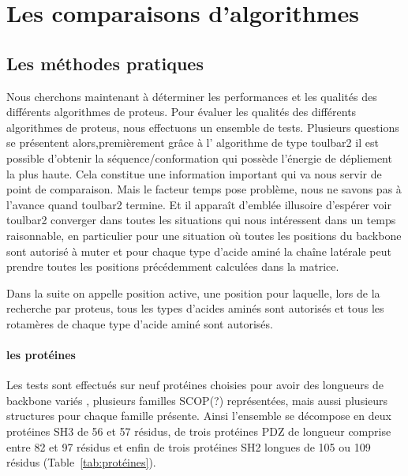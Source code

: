 \chapter{Les comparaisons d'algorithmes}
\label{chap:resultats_comparaisons}


\section{Les méthodes pratiques} 

Nous cherchons maintenant à déterminer les performances et les qualités des différents algorithmes de proteus.
Pour évaluer les qualités des différents algorithmes de proteus, nous effectuons un ensemble de tests. 
Plusieurs questions se présentent alors,premièrement grâce à l' algorithme de type toulbar2 il est possible d'obtenir la séquence/conformation qui possède l'énergie de dépliement la plus haute. Cela constitue une information important qui va nous servir de point de comparaison. Mais le facteur temps pose problème, nous ne savons pas à l'avance quand toulbar2 termine. Et il apparaît d'emblée illusoire d'espérer voir toulbar2 converger dans toutes les situations qui nous intéressent dans un temps raisonnable, en particulier pour une situation où  toutes les positions du  backbone sont autorisé à muter et pour chaque type d'acide aminé la chaîne latérale peut prendre toutes les positions précédemment calculées dans la matrice. 


Dans la suite on appelle position active, une position pour laquelle, lors de la recherche par proteus, tous les types d'acides aminés sont autorisés et tous les rotamères de chaque type d'acide aminé sont autorisés.


\subsubsection{les protéines}
 
Les tests sont effectués sur neuf protéines choisies pour avoir des longueurs de backbone variés , plusieurs familles SCOP(?) représentées, mais aussi plusieurs structures pour chaque famille présente. Ainsi l'ensemble se décompose en deux protéines SH3 de 56 et 57 résidus, de trois protéines PDZ de longueur comprise entre 82 et 97 résidus  et enfin de trois protéines SH2  longues de 105 ou 109 résidus (Table~\ref{tab:protéines}).  


